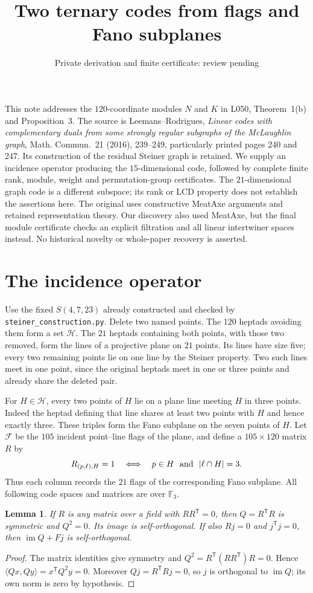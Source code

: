 \documentclass[11pt,a4paper]{article}
\title{Two ternary codes from flags and Fano subplanes}
\author{Private derivation and finite certificate: review pending}
\date{}
\newtheorem{lemma}{Lemma}
\newcommand{\im}{\operatorname{im}}
\begin{document}
\maketitle

This note addresses the $120$-coordinate modules $N$ and $K$ in
L050, Theorem~1(b) and Proposition~3. The source is Leemans--Rodrigues,
\emph{Linear codes with complementary duals from some strongly regular
subgraphs of the McLaughlin graph}, Math. Commun.\ 21 (2016), 239--249,
particularly printed pages 240 and 247. Its construction of the residual
Steiner graph is retained. We supply an incidence operator producing the
$15$-dimensional code, followed by complete finite rank, module, weight and
permutation-group certificates. The $21$-dimensional graph code is a different
subspace; its rank or LCD property does not establish the assertions here.
The original uses constructive MeatAxe arguments and retained representation
theory. Our discovery also used MeatAxe, but the final module certificate
checks an explicit filtration and all linear intertwiner spaces instead.
No historical novelty or whole-paper recovery is asserted.

\section{The incidence operator}
Use the fixed $S(4,7,23)$ already constructed and checked by
\texttt{steiner\_construction.py}. Delete two named points. The $120$ heptads
avoiding them form a set $\mathcal H$. The $21$ heptads containing both
points, with those two removed, form the lines of a projective plane on
$21$ points. Its lines have size five; every two remaining points lie on
one line by the Steiner property. Two such lines meet in one point, since
the original heptads meet in one or three points and already share the
deleted pair.

For $H\in\mathcal H$, every two points of $H$ lie on a plane line meeting
$H$ in three points. Indeed the heptad defining that line shares at least
two points with $H$ and hence exactly three. These triples form the Fano
subplane on the seven points of $H$. Let $\mathcal F$ be the $105$ incident
point--line flags of the plane, and define a $105\times120$ matrix $R$ by
\[
 R_{(p,\ell),H}=1\quad\Longleftrightarrow\quad
 p\in H\ \hbox{ and }\ |\ell\cap H|=3.
\]
Thus each column records the $21$ flags of the corresponding Fano subplane.
All following code spaces and matrices are over $\mathbb F_3$.

\begin{lemma}\label{lem:square}
If $R$ is any matrix over a field with $RR^{\mathsf T}=0$, then
$Q=R^{\mathsf T}R$ is symmetric and $Q^2=0$. Its image is self-orthogonal.
If also $Rj=0$ and $j^{\mathsf T}j=0$, then $\im Q+Fj$ is self-orthogonal.
\end{lemma}
\begin{proof}
The matrix identities give symmetry and
$Q^2=R^{\mathsf T}(RR^{\mathsf T})R=0$. Hence
$\langle Qx,Qy\rangle=x^{\mathsf T}Q^2y=0$.
Moreover $Qj=R^{\mathsf T}Rj=0$, so $j$ is orthogonal to $\im Q$;
its own norm is zero by hypothesis.
\end{proof}
\end{document}

